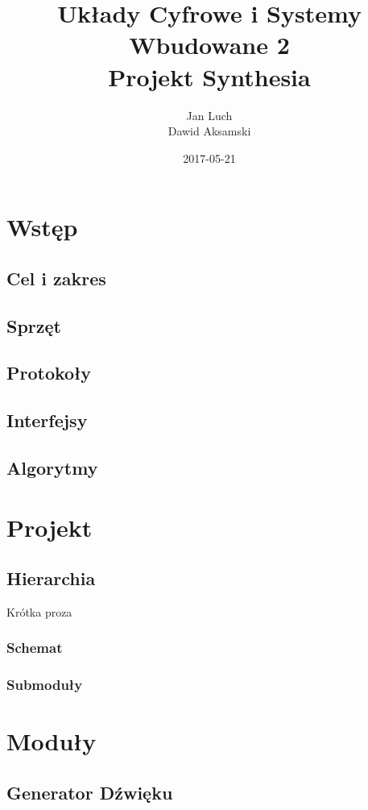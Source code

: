 \documentclass{article}
\title{Układy Cyfrowe i Systemy Wbudowane 2\\Projekt Synthesia}
\date{2017-05-21}
\author{Jan Luch\\Dawid Aksamski}
\begin{document}
\maketitle
\newpage

\tableofcontents
\newpage


\section{Wstęp}
	\subsection{Cel i zakres}
	\subsection{Sprzęt}
	\subsection{Protokoły}
	\subsection{Interfejsy}
	\subsection{Algorytmy}

\section{Projekt}
	\subsection{Hierarchia}
	Krótka proza
		\subsubsection{Schemat}
		\subsubsection{Submoduły}
		
\section{Moduły}
	\subsection{Generator Dźwięku}
\end{document}

